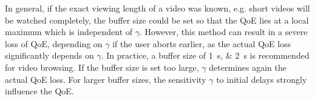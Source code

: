 In general, if the exact viewing length of a video was known, e.g. short videos will be watched completely, the buffer size could be set so that the \gls{QoE} lies at a local maximum which is independent of \(\gamma\).
However, this method can result in a severe loss of \gls{QoE}, depending on \(\gamma\) if the user aborts earlier, as the actual \gls{QoE} loss significantly depends on \(\gamma\). 
In practice, a buffer size of \SIlist{1;2}{\second} is recommended for video browsing. 
If the buffer size is set too large, \(\gamma\) determines again the actual \gls{QoE} loss.
For larger buffer sizes, the sensitivity \(\gamma\) to initial delays strongly influence the \gls{QoE}.